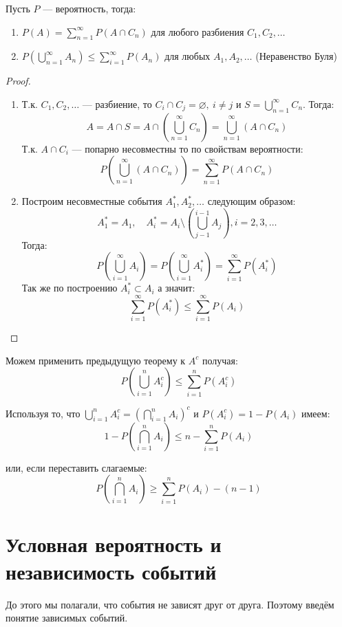 \documentclass[document]{subfiles}
\begin{document}
\begin{theorem}
    Пусть $P$ --- вероятность, тогда:
    \begin{enumerate}
        \item $P(A) = \sum_{n=1}^\infty P(A \cap C_n)$ для любого разбиения $C_1, C_2, \dots$
        \item $P(\bigcup_{n=1}^\infty A_n) \le \sum_{i=1}^\infty P(A_n)$ для любых $A_1, A_2, \dots$ (Неравенство Буля)
    \end{enumerate}
\end{theorem}
\begin{proof}
    \begin{enumerate}
        \item Т.к. $C_1, C_2, \dots$ --- разбиение, то $C_i \cap C_j = \varnothing, ~ i \ne j$ и $S = \bigcup_{n=1}^\infty C_n$. Тогда:
            \[A = A \cap S = A \cap \left(\bigcup_{n=1}^\infty C_n\right) = \bigcup_{n=1}^\infty (A \cap C_n)\]
            Т.к. $A \cap C_i$ --- попарно несовместны то по свойствам вероятности:
            \[P\left(\bigcup_{n=1}^\infty (A \cap C_n)\right) = \sum_{n=1}^\infty P(A \cap C_n)\]
        \item Построим несовместные события $A_1^*, A_2^*, \dots$ следующим образом:
            \[A_1^* = A_1, \quad A_i^* = A_i \setminus \left( \bigcup_{j-1}^{i-1}A_j\right), i=2,3,\dots\]
            Тогда:
            \[P\left(\bigcup_{i=1}^\infty A_i\right) = P\left(\bigcup_{i=1}^\infty A_i^*\right) = \sum_{i=1}^\infty P(A_i^*)\]
            Так же по построению $A_i^* \subset A_i$ а значит:
            \[\sum_{i=1}^\infty P(A_i^*) \le \sum_{i=1}^\infty P(A_i)\]
    \end{enumerate}
\end{proof}

Можем применить предыдущую теорему к $A^c$ получая:
\[P\left(\bigcup_{i=1}^n A_i^c \right) \le \sum_{i=1}^n P(A_i^c)\]

Используя то, что $\bigcup_{i=1}^n A^c_i = (\bigcap_{i=1}^n A_i)^c$ и $P(A_i^c) = 1 - P(A_i)$ имеем:
\[1 - P \left(\bigcap_{i=1}^n A_i\right) \le n - \sum_{i=1}^n P(A_i)\]

или, если переставить слагаемые:
\[P\left( \bigcap_{i=1}^n A_i\right) \ge \sum_{i=1}^n P(A_i) - (n - 1)\]

\section{Условная вероятность и независимость событий}

До этого мы полагали, что события не зависят друг от друга. Поэтому введём понятие зависимых событий.
\end{document}
